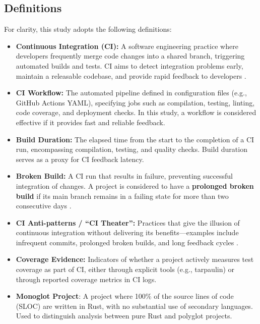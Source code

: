 \documentclass[11pt]{article}
\begin{document}
\subsection{Definitions}
For clarity, this study adopts the following definitions:
\begin{itemize}
\item \textbf{Continuous Integration (CI):} A software engineering practice where developers frequently merge code changes into a shared branch, triggering automated builds and tests. CI aims to detect integration problems early, maintain a releasable codebase, and provide rapid feedback to developers \autocite{Fowler2024}.

\item \textbf{CI Workflow:} The automated pipeline defined in configuration files (e.g., GitHub Actions YAML), specifying jobs such as compilation, testing, linting, code coverage, and deployment checks. In this study, a workflow is considered effective if it provides fast and reliable feedback.

\item \textbf{Build Duration:} The elapsed time from the start to the completion of a CI run, encompassing compilation, testing, and quality checks. Build duration serves as a proxy for CI feedback latency.

\item \textbf{Broken Build:} A CI run that results in failure, preventing successful integration of changes. A project is considered to have a \textbf{prolonged broken build} if its main branch remains in a failing state for more than two consecutive days \autocite{felidre2019ci_theater}.

\item \textbf{CI Anti-patterns / “CI Theater”:} Practices that give the illusion of continuous integration without delivering its benefits—examples include infrequent commits, prolonged broken builds, and long feedback cycles \autocite{felidre2019ci_theater}.

\item \textbf{Coverage Evidence:} Indicators of whether a project actively measures test coverage as part of CI, either through explicit tools (e.g., tarpaulin) or through reported coverage metrics in CI logs.

\item \textbf{Monoglot Project}: A project where 100\% of the source lines of code (SLOC) are written in Rust, with no substantial use of secondary languages. Used to distinguish analysis between pure Rust and polyglot projects.


\end{itemize}
\end{document}
